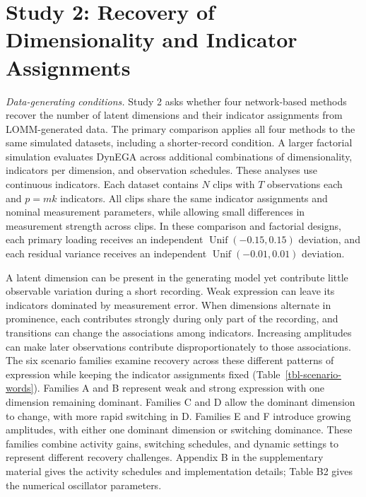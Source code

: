 \documentclass[
]{article}
\begin{document}
\section{Study 2: Recovery of Dimensionality and Indicator
Assignments}\label{study-2-recovery-of-dimensionality-and-indicator-assignments}

\emph{Data-generating conditions.} Study 2 asks whether four
network-based methods recover the number of latent dimensions and their
indicator assignments from LOMM-generated data. The primary comparison
applies all four methods to the same simulated datasets, including a
shorter-record condition. A larger factorial simulation evaluates DynEGA
across additional combinations of dimensionality, indicators per
dimension, and observation schedules. These analyses use continuous
indicators. Each dataset contains \(N\) clips with \(T\) observations
each and \(p=mk\) indicators. All clips share the same indicator
assignments and nominal measurement parameters, while allowing small
differences in measurement strength across clips. In these comparison
and factorial designs, each primary loading receives an independent
\(\operatorname{Unif}(-0.15,0.15)\) deviation, and each residual
variance receives an independent \(\operatorname{Unif}(-0.01,0.01)\)
deviation.

A latent dimension can be present in the generating model yet contribute
little observable variation during a short recording. Weak expression
can leave its indicators dominated by measurement error. When dimensions
alternate in prominence, each contributes strongly during only part of
the recording, and transitions can change the associations among
indicators. Increasing amplitudes can make later observations contribute
disproportionately to those associations. The six scenario families
examine recovery across these different patterns of expression while
keeping the indicator assignments fixed
(Table~\ref{tbl-scenario-words}). Families A and B represent weak and
strong expression with one dimension remaining dominant. Families C and
D allow the dominant dimension to change, with more rapid switching in
D. Families E and F introduce growing amplitudes, with either one
dominant dimension or switching dominance. These families combine
activity gains, switching schedules, and dynamic settings to represent
different recovery challenges. Appendix B in the supplementary material
gives the activity schedules and implementation details; Table B2 gives
the numerical oscillator parameters.
\end{document}
